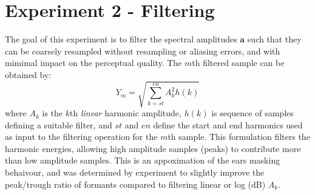 \documentclass{article}
\begin{document}
\section{Experiment 2 - Filtering}

The goal of this experiment is to filter the spectral amplitudes $\mathbf{a}$ such that they can be coarsely resampled without resampling or aliasing errors, and with mimimal impact on the perceptual quality.
The $m$th filtered sample can be obtained by:
\begin{equation}
Y_m = \sqrt{\sum_{k=st}^{en}A_k^2 h(k)}
\end{equation}
where $A_k$ is the $k$th \emph{linear} harmonic amplitude, $h(k)$ is sequence of samples defining a suitable filter, and $st$ and $en$ define the start and end harmonics used as input to the filtering operation for the $m$th sample.  This formulation filters the harmonic energies, allowing high amplitude samples (peaks) to contribute more than low amplitude samples. This is an appoximation of the ears masking behaivour, and was determined by experiment to slightly improve the peak/trough ratio of formants compared to filtering linear or log (dB) $A_k$.
\end{document}
